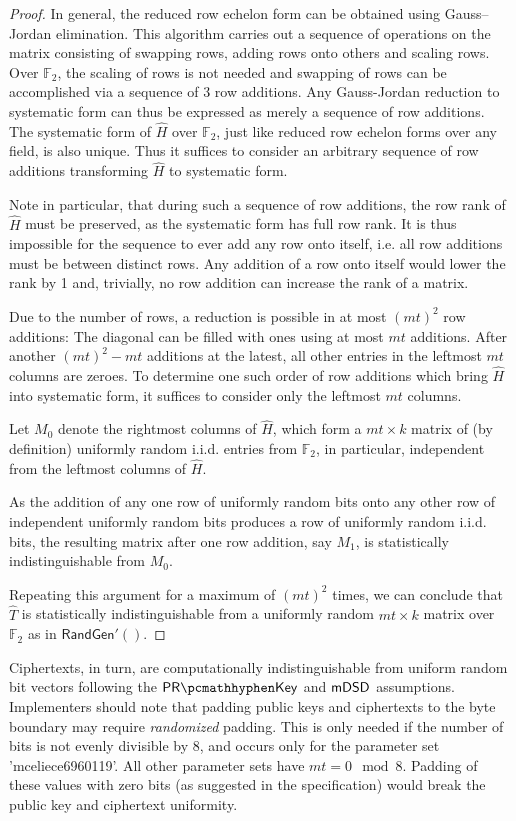 \begin{proof}
    In general, the reduced row echelon form can be obtained using Gauss–Jordan elimination. This algorithm carries out a sequence of operations on the matrix consisting of swapping rows, adding rows onto others and scaling rows.
    Over $\mathbb F_2$, the scaling of rows is not needed and swapping of rows can be accomplished via a sequence of 3 row additions. Any Gauss-Jordan reduction to systematic form can thus be expressed as merely a sequence of row additions.
    The systematic form of $\hat H$ over $\mathbb F_2$, just like reduced row echelon forms over any field, is also unique. Thus it suffices to consider an arbitrary sequence of row additions transforming $\hat H$ to systematic form.

    Note in particular, that during such a sequence of row additions, the row rank of $\hat H$ must be preserved, as the systematic form has full row rank. It is thus impossible for the sequence to ever add any row onto itself, i.e. all row additions must be between distinct rows. Any addition of a row onto itself would lower the rank by 1 and, trivially, no row addition can increase the rank of a matrix.
    
    Due to the number of rows, a reduction is possible in at most $(mt)^2$ row additions: The diagonal can be filled with ones using at most $mt$ additions. After another $(mt)^2-mt$ additions at the latest, all other entries in the leftmost $mt$ columns are zeroes. To determine one such order of row additions which bring $\hat H$ into systematic form, it suffices to consider only the leftmost $mt$ columns.
    
    Let $M_0$ denote the rightmost columns of $\hat H$, which form a $mt \times k$ matrix of (by definition) uniformly random i.i.d. entries from $\mathbb F_2$, in particular, independent from the leftmost columns of $\hat H$.
    
    As the addition of any one row of uniformly random bits onto any other row of independent uniformly random bits produces a row of uniformly random i.i.d. bits, the resulting matrix after one row addition, say $M_1$, is statistically indistinguishable from $M_0$.
    
    Repeating this argument for a maximum of $(mt)^2$ times, we can conclude that $\hat T$ is statistically indistinguishable from a uniformly random $mt \times k$ matrix over $\mathbb F_2$ as in $\textsf{RandGen}'()$.
\end{proof}

Ciphertexts, in turn, are computationally indistinguishable from uniform random bit vectors following the $\prkey$ and $\mathsf{mDSD}$ assumptions. Implementers should note that padding public keys and ciphertexts to the byte boundary may require \emph{randomized} padding. This is only needed if the number of bits is not evenly divisible by 8, and occurs only for the parameter set 'mceliece6960119'.  All other parameter sets have $mt = 0 \mod 8$. Padding of these values with zero bits (as suggested in the specification) would break the public key and ciphertext uniformity.

